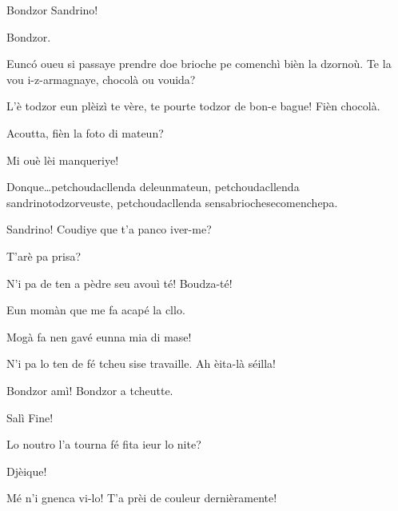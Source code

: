 \begin{drama}
\Saventaspeaks Bondzor Sandrino!

\Sandrinospeaks Bondzor.

\Saventaspeaks Eunc\'o oueu si passaye prendre doe brioche pe comenchì bièn la dzornoù. Te la vou i-z-armagnaye, chocolà ou vouida?

\Sandrinospeaks L'è todzor eun plèizì te vère, te pourte todzor de bon-e bague! Fièn chocolà.


\Saventaspeaks Acoutta, fièn la foto di mateun?

\Sandrinospeaks Mi ouè lèi manqueriye!



\Saventaspeaks{} Donque\ldots petchoudacllenda deleunmateun, petchoudacllenda sandrinotodzorveuste, pe\-tchou\-da\-cllen\-da sensabriochesecomenchepa.

\Saventaspeaks {} Sandrino! Coudiye que t'a panco iver-me?

\Sandrinospeaks{} T'arè pa prisa?

\Saventaspeaks N'i pa de ten a pèdre seu avouì té! Boudza-té!

\Sandrinospeaks Eun momàn que me fa acapé la cllo.


\Saventaspeaks{} Mogà fa nen gavé eunna mia di mase!

\Sandrinospeaks N'i pa lo ten de fé tcheu sise travaille. Ah èita-là séilla!


\Saventaspeaks Bondzor amì! Bondzor a tcheutte.

\Tcheuttespeaks Salì Fine!

\Saventaspeaks{} Lo noutro l'a tourna fé fita ieur lo nite?

\Tuenospeaks Djèique!

\Richardspeaks Mé n'i gnenca vi-lo!  T'a prèi de couleur dernièramente!


\end{drama}
